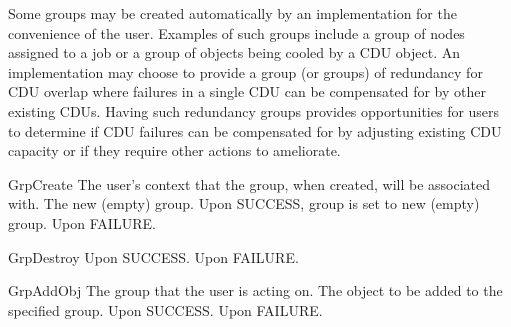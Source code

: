 Some groups may be created automatically by an implementation for the convenience of the user. Examples of such groups include
a group of nodes assigned to a job or a group of objects being cooled by a CDU object. An implementation may choose to provide
a group (or groups) of redundancy for CDU overlap where failures in a single CDU can be compensated for by other existing CDUs.
Having such redundancy groups provides opportunities for users to determine if CDU failures can be compensated for by adjusting
existing CDU capacity or if they require other actions to ameliorate. 

\begin{prototype}{GrpCreate}
		{\pInput} {The user's context that the group, when created, will be associated with.}
	   	{\pOutput}{The new (empty) group.}
	 	{Upon SUCCESS, group is set to new (empty) group.}
	 	{Upon FAILURE.}
\end{prototype}

\begin{prototype}{GrpDestroy}
	 	{Upon SUCCESS.}
	 	{Upon FAILURE.}
\end{prototype}

\begin{prototype}{GrpAddObj}
	 	{\pInputOutput}	{The group that the user is acting on.}
		{\pInput}       {The object to be added to the specified group.}
	 	{Upon SUCCESS.}
	 	{Upon FAILURE.}
\end{prototype}

